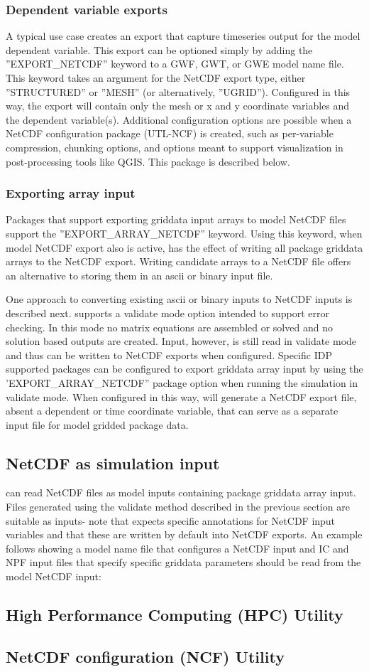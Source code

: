 \subsubsection{Dependent variable exports}
A typical use case creates an export that capture timeseries output for the model dependent variable.  This export can be optioned simply by adding the ''EXPORT\_NETCDF'' keyword to a GWF, GWT, or GWE model name file.  This keyword takes an argument for the NetCDF export type, either ''STRUCTURED'' or ''MESH'' (or alternatively, ''UGRID'').  Configured in this way, the export will contain only the mesh or x and y coordinate variables and the dependent variable(s).  Additional configuration options are possible when a NetCDF configuration package (UTL-NCF) is created, such as per-variable compression, chunking options, and options meant to support visualization in post-processing tools like QGIS.  This package is described below.

\subsubsection{Exporting array input}
Packages that support exporting griddata input arrays to model NetCDF files support the ''EXPORT\_ARRAY\_NETCDF'' keyword.  Using this keyword, when model NetCDF export also is active, has the effect of writing all package griddata arrays to the NetCDF export.  Writing candidate arrays to a NetCDF file offers an alternative to storing them in an ascii or binary input file.

One approach to converting existing ascii or binary inputs to NetCDF inputs is described next.  \mf supports a validate mode option intended to support error checking.  In this mode no matrix equations are assembled or solved and no solution based outputs are created.  Input, however, is still read in validate mode and thus can be written to NetCDF exports when configured. Specific IDP supported packages can be configured to export griddata array input by using the 'EXPORT\_ARRAY\_NETCDF'' package option when running the simulation in validate mode.  When configured in this way, \mf will generate a NetCDF export file, absent a dependent or time coordinate variable, that can serve as a separate input file for model gridded package data.

\subsection{NetCDF as simulation input}
\mf can read NetCDF files as model inputs containing package griddata array input. Files generated using the validate method described in the previous section are suitable as inputs- note that \mf expects specific annotations for NetCDF input variables and that these are written by default into \mf NetCDF exports. An example follows showing a model name file that configures a NetCDF input and IC and NPF input files that specify specific griddata parameters should be read from the model NetCDF input:


\subsection{High Performance Computing (HPC) Utility}


\subsection{NetCDF configuration (NCF) Utility}

